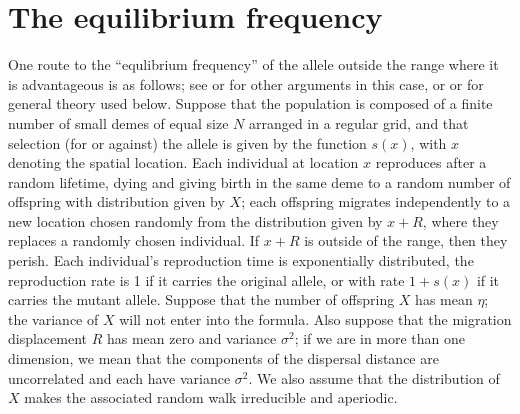 \documentclass{article}
\begin{document}
\section{The equilibrium frequency}
\label{apx:eqfreq}

One route to the ``equlibrium frequency'' of the allele outside the range where it is advantageous is as follows;
see \citet{slatkin1973geneflow} or \citet{barton1987establishment,pollak1966survival} for other arguments in this case, 
or \citet{etheridge2000introduction} or \citet{dawson1993measurevalued} for general theory used below.
Suppose that the population is composed of a finite number of small demes of equal size $N$ arranged in a regular grid,
and that selection (for or against) the allele is given by the function $s(x)$, with $x$ denoting the spatial location.
Each individual at location $x$ reproduces after a random lifetime,
dying and giving birth in the same deme to a random number of offspring with distribution given by $X$;
each offspring migrates independently to a new location chosen randomly from the distribution given by $x+R$,
where they replaces a randomly chosen individual.
If $x+R$ is outside of the range, then they perish.
Each individual's reproduction time is exponentially distributed, 
the reproduction rate is 1 if it carries the original allele, or with rate $1+s(x)$ if it carries the mutant allele.
Suppose that the number of offspring $X$ has mean $\eta$; the variance of $X$ will not enter into the formula.
Also suppose that the migration displacement $R$ has mean zero and variance $\sigma^2$;
if we are in more than one dimension, we mean that the components of the dispersal distance are uncorrelated
and each have variance $\sigma^2$.
We also assume that the distribution of $X$ makes the associated random walk irreducible and aperiodic.
\end{document}
